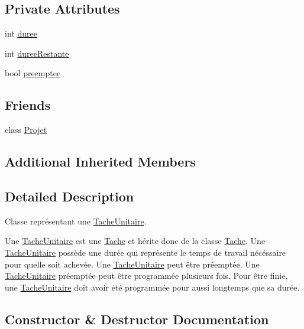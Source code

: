 \subsection*{Private Attributes}
\begin{DoxyCompactItemize}
\item 
int \hyperlink{class_tache_unitaire_a5510c1941069a4391e076ec45e0201fc}{duree}
\item 
int \hyperlink{class_tache_unitaire_a73dd33a7047739e49c80373aeae3158e}{duree\+Restante}
\item 
bool \hyperlink{class_tache_unitaire_a21bc1074f99a80976a52d910e3c21041}{preemptee}
\end{DoxyCompactItemize}
\subsection*{Friends}
\begin{DoxyCompactItemize}
\item 
class \hyperlink{class_tache_unitaire_ab87b41c3faa36955cc370972f5cce344}{Projet}
\end{DoxyCompactItemize}
\subsection*{Additional Inherited Members}


\subsection{Detailed Description}
Classe représentant une \hyperlink{class_tache_unitaire}{Tache\+Unitaire}. 

Une \hyperlink{class_tache_unitaire}{Tache\+Unitaire} est une \hyperlink{class_tache}{Tache} et hérite donc de la classe \hyperlink{class_tache}{Tache}. Une \hyperlink{class_tache_unitaire}{Tache\+Unitaire} possède une durée qui représente le temps de travail nécéssaire pour qu\textquotesingle{}elle soit achevée. Une \hyperlink{class_tache_unitaire}{Tache\+Unitaire} peut être préemptée. Une \hyperlink{class_tache_unitaire}{Tache\+Unitaire} préemptée peut être programmée plusieurs fois. Pour être finie, une \hyperlink{class_tache_unitaire}{Tache\+Unitaire} doit avoir été programmée pour aussi longtemps que sa durée. 

\subsection{Constructor \& Destructor Documentation}
\hypertarget{class_tache_unitaire_acca628b1c239bf191fbbf869ad15cdd2}{}
